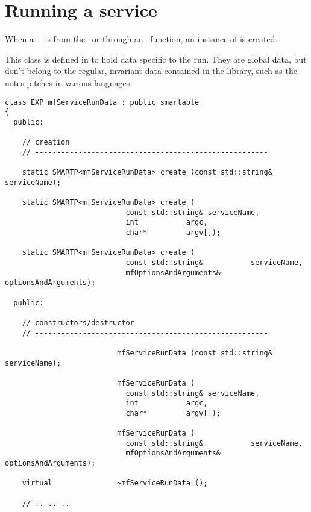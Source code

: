 \section{Running a service}

When a \mf\ \service\ is  from the \CLI\ or through an \API\ function, an instance of  is created.

This class   is defined in  to hold data specific to the run. They are global data, but don't belong to the regular, invariant data contained in the library, such as the notes pitches in various languages: %
\begin{lstlisting}[language=CPlusPlus]
class EXP mfServiceRunData : public smartable
{
  public:

    // creation
    // ------------------------------------------------------

    static SMARTP<mfServiceRunData> create (const std::string& serviceName);

    static SMARTP<mfServiceRunData> create (
                            const std::string& serviceName,
                            int           argc,
                            char*         argv[]);

    static SMARTP<mfServiceRunData> create (
                            const std::string&           serviceName,
                            mfOptionsAndArguments& optionsAndArguments);

  public:

    // constructors/destructor
    // ------------------------------------------------------

                          mfServiceRunData (const std::string& serviceName);

                          mfServiceRunData (
                            const std::string& serviceName,
                            int           argc,
                            char*         argv[]);

                          mfServiceRunData (
                            const std::string&           serviceName,
                            mfOptionsAndArguments& optionsAndArguments);

    virtual               ~mfServiceRunData ();

	// .. .. ..


\end{lstlisting}
